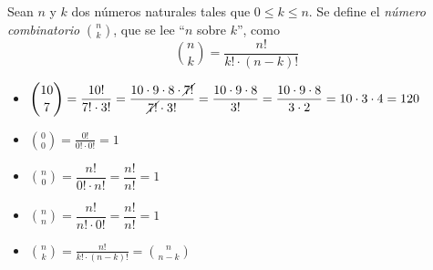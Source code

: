 \begin{definicion}
Sean $n$ y $k$ dos números naturales tales que $0\le k \le n$. Se define el \emph{número combinatorio} $\displaystyle\binom{n}{k}$, que se lee ``$n$ sobre $k$'', como 
\[%
\binom{n}{k} = \frac{n!}{k!\cdot(n-k)!}
\]
\end{definicion}
%
\begin{ejemplo}\label{ej:comb}\rule{0pt}{0pt}
\begin{itemize}
\item %
$\displaystyle\binom{10}{7} =
\dfrac{10!}{7!\cdot 3!} =
\dfrac{10\cdot 9\cdot 8\cdot \cancel{7!}}{\cancel{7!}\cdot 3!} =
\dfrac{10\cdot 9\cdot 8}{3!} =
\dfrac{10\cdot 9\cdot 8}{3\cdot 2} =
10\cdot 3\cdot 4=120$

\item
$\displaystyle\binom{0}{0} = \frac{0!}{0!\cdot 0!} = 1$


\item\label{binomn0}
$\displaystyle\binom{n}{0} =\dfrac{n!}{0!\cdot n!} =\dfrac{n!}{n!} =1$\hfill

\item\label{binomnn}
$\displaystyle\binom{n}{n} =\dfrac{n!}{n!\cdot 0!} =\dfrac{n!}{n!} =1$\hfill

\item\label{binomnk}
$\displaystyle\binom{n}{k}=\frac{n!}{k!\cdot(n-k)!}=\binom{n}{n-k}$\fej
\end{itemize}
\end{ejemplo}

